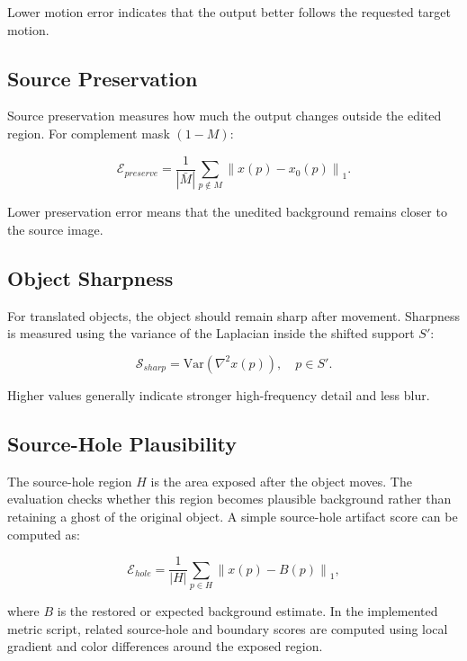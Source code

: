Lower motion error indicates that the output better follows the requested target motion.

\subsection{Source Preservation}

Source preservation measures how much the output changes outside the edited region. For complement mask $(1-M)$:

\begin{equation}
\mathcal{E}_{preserve} =
\frac{1}{|\bar{M}|}
\sum_{p \notin M}
\left\|
x(p)-x_0(p)
\right\|_1.
\label{eq:source-preservation-error}
\end{equation}

Lower preservation error means that the unedited background remains closer to the source image.

\subsection{Object Sharpness}

For translated objects, the object should remain sharp after movement. Sharpness is measured using the variance of the Laplacian inside the shifted support $S'$:

\begin{equation}
\mathcal{S}_{sharp} =
\mathrm{Var}\left(\nabla^2 x(p)\right), \quad p \in S'.
\label{eq:sharpness}
\end{equation}

Higher values generally indicate stronger high-frequency detail and less blur.

\subsection{Source-Hole Plausibility}

The source-hole region $H$ is the area exposed after the object moves. The evaluation checks whether this region becomes plausible background rather than retaining a ghost of the original object. A simple source-hole artifact score can be computed as:

\begin{equation}
\mathcal{E}_{hole} =
\frac{1}{|H|}
\sum_{p \in H}
\left\|
x(p)-B(p)
\right\|_1,
\label{eq:hole-score}
\end{equation}

where $B$ is the restored or expected background estimate. In the implemented metric script, related source-hole and boundary scores are computed using local gradient and color differences around the exposed region.

